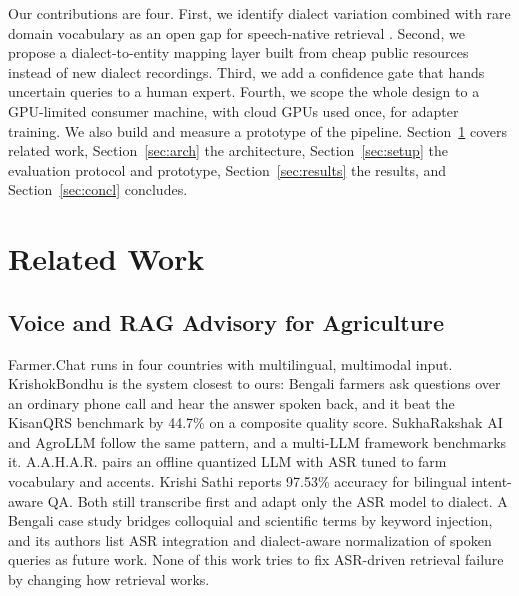 \documentclass[conference]{IEEEtran}
\begin{document}
\noindent Our contributions are four. First, we identify dialect variation combined with rare domain vocabulary as an open gap for speech-native retrieval \cite{min2025speechrag,google2025s2r}. Second, we propose a dialect-to-entity mapping layer built from cheap public resources instead of new dialect recordings. Third, we add a confidence gate that hands uncertain queries to a human expert. Fourth, we scope the whole design to a GPU-limited consumer machine, with cloud GPUs used once, for adapter training. We also build and measure a prototype of the pipeline. Section~\ref{sec:related} covers related work, Section~\ref{sec:arch} the architecture, Section~\ref{sec:setup} the evaluation protocol and prototype, Section~\ref{sec:results} the results, and Section~\ref{sec:concl} concludes.

\section{Related Work}\label{sec:related}

\subsection{Voice and RAG Advisory for Agriculture}
Farmer.Chat \cite{farmerchat2024} runs in four countries with multilingual, multimodal input. KrishokBondhu \cite{ameen2026krishokbondhu} is the system closest to ours: Bengali farmers ask questions over an ordinary phone call and hear the answer spoken back, and it beat the KisanQRS benchmark \cite{rehman2023kisanqrs} by 44.7\% on a composite quality score. SukhaRakshak AI \cite{iwmi2025sukharakshak} and AgroLLM \cite{agrollm2025} follow the same pattern, and a multi-LLM framework \cite{sawant2026farmeraiframework} benchmarks it. A.A.H.A.R. \cite{dubey2025aahar} pairs an offline quantized LLM with ASR tuned to farm vocabulary and accents. Krishi Sathi \cite{vijayvargia2025krishisathi} reports 97.53\% accuracy for bilingual intent-aware QA. Both still transcribe first and adapt only the ASR model to dialect. A Bengali case study \cite{hossain2026bengalirag} bridges colloquial and scientific terms by keyword injection, and its authors list ASR integration and dialect-aware normalization of spoken queries as future work. None of this work tries to fix ASR-driven retrieval failure by changing how retrieval works.
\end{document}
